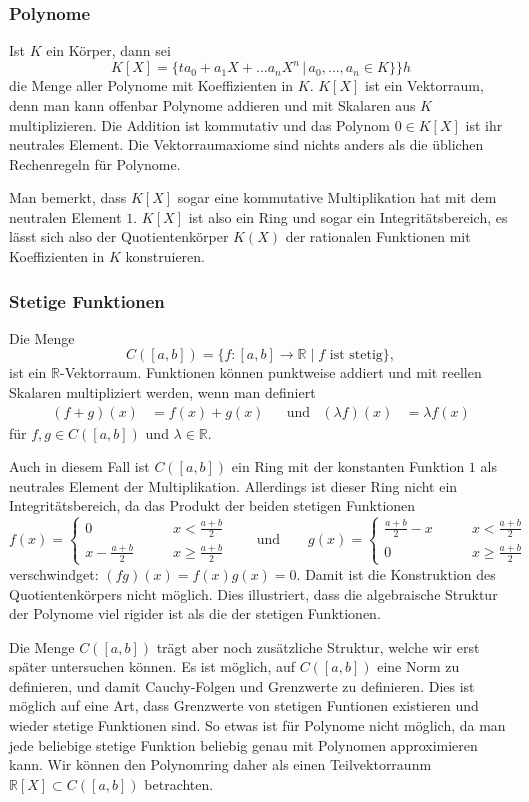 \subsubsection{Polynome}
Ist $K$ ein Körper, dann sei
\[
K[X]
=
\{t
a_0+a_1X+\dots a_nX^n\,|\, a_0,\dots,a_n\in K\}
\}h
\]
die Menge aller Polynome mit Koeffizienten in $K$.
$K[X]$ ist ein Vektorraum, denn man kann offenbar Polynome addieren und
mit Skalaren aus $K$ multiplizieren.
Die Addition ist kommutativ und das Polynom $0\in K[X]$ ist ihr neutrales
Element.
Die Vektorraumaxiome sind nichts anders als die üblichen Rechenregeln
für Polynome.

Man bemerkt, dass $K[X]$ sogar eine kommutative Multiplikation hat
mit dem neutralen Element $1$.
$K[X]$ ist also ein Ring und sogar ein Integritätsbereich, es lässt sich
also der Quotientenkörper $K(X)$ der rationalen Funktionen mit Koeffizienten
in $K$ konstruieren.

\subsubsection{Stetige Funktionen}
Die Menge
\[
C([a,b])
=
\{ f\colon [a,b]\to \mathbb R\;|\; \text{$f$ ist stetig}\},
\]
ist ein $\mathbb R$-Vektorraum.
Funktionen können punktweise addiert und mit reellen Skalaren multipliziert
werden, wenn man definiert
\[
\begin{aligned}
(f+g)(x)&=f(x)+g(x)
&&\text{und}
&
(\lambda f)(x)&=\lambda f(x)
\end{aligned}
\]
für $f,g\in C([a,b])$ und $\lambda\in\mathbb R$.

Auch in diesem Fall ist $C([a,b])$ ein Ring mit der konstanten Funktion $1$
als neutrales Element der Multiplikation.
Allerdings ist dieser Ring nicht ein Integritätsbereich, da das Produkt der
beiden stetigen Funktionen
\[
f(x)
=
\begin{cases}
0&\qquad x<\frac{a+b}2\\
x-\frac{a+b}2&\qquad x\ge \frac{a+b}2
\end{cases}
\qquad\text{und}\qquad
g(x)
=
\begin{cases}
\frac{a+b}2-x&\qquad x<\frac{a+b}2\\
0&\qquad x\ge \frac{a+b}2
\end{cases}
\]
verschwindget: $(fg)(x)=f(x)g(x)=0$.
Damit ist die Konstruktion des Quotientenkörpers nicht möglich.
Dies illustriert, dass die algebraische Struktur der Polynome viel
rigider ist als die der stetigen Funktionen.

Die Menge $C([a,b])$ trägt aber noch zusätzliche Struktur, welche
wir erst später untersuchen können.
Es ist möglich, auf $C([a,b])$ eine Norm zu definieren, und damit
Cauchy-Folgen und Grenzwerte zu definieren.
Dies ist möglich auf eine Art, dass Grenzwerte von stetigen Funtionen
existieren und wieder stetige Funktionen sind.
So etwas ist für Polynome nicht möglich, da man jede beliebige stetige
Funktion beliebig genau mit Polynomen approximieren kann.
Wir können den Polynomring daher als einen Teilvektorraunm
$\mathbb R[X]\subset C([a,b])$ betrachten.

